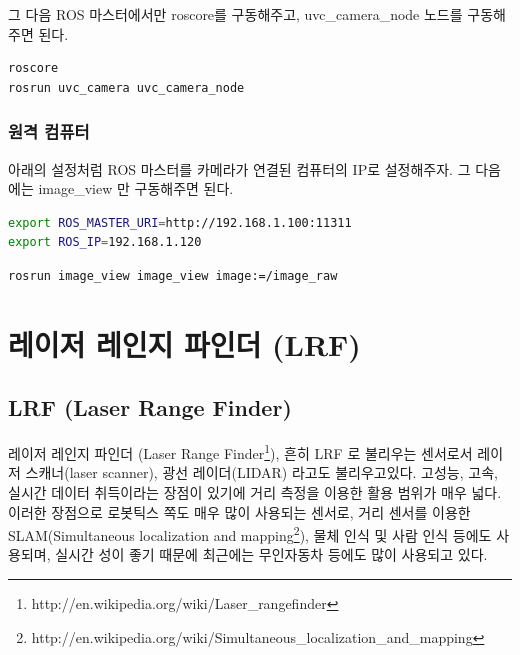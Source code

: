 그 다음 ROS 마스터에서만 roscore를 구동해주고, uvc\_camera\_node 노드를 구동해 주면 된다.

\begin{lstlisting}[language=ROS]
roscore
rosrun uvc_camera uvc_camera_node
\end{lstlisting}

\subsubsection{원격 컴퓨터}

아래의 설정처럼 ROS 마스터를 카메라가 연결된 컴퓨터의 IP로 설정해주자. 그 다음에는 image\_view 만 구동해주면 된다.

\begin{lstlisting}[language=bash]
export ROS_MASTER_URI=http://192.168.1.100:11311 
export ROS_IP=192.168.1.120
\end{lstlisting}

\begin{lstlisting}[language=ROS]
rosrun image_view image_view image:=/image_raw
\end{lstlisting}

\section{레이저 레인지 파인더 (LRF)}

\subsection{LRF (Laser Range Finder)}

레이저 레인지 파인더 (Laser Range Finder\footnote{http://en.wikipedia.org/wiki/Laser\_rangefinder}), 흔히 LRF 로 불리우는 센서로서 레이저 스캐너(laser scanner), 광선 레이더(LIDAR) 라고도 불리우고있다. 고성능, 고속, 실시간 데이터 취득이라는 장점이 있기에 거리 측정을 이용한 활용 범위가 매우 넓다. 이러한 장점으로 로봇틱스 쪽도 매우 많이 사용되는 센서로, 거리 센서를 이용한 SLAM(Simultaneous localization and mapping\footnote{http://en.wikipedia.org/wiki/Simultaneous\_localization\_and\_mapping}), 물체 인식 및 사람 인식 등에도 사용되며, 실시간 성이 좋기 때문에 최근에는 무인자동차 등에도 많이 사용되고 있다. 

